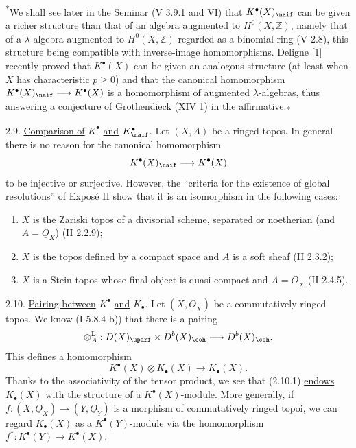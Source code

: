 \textsuperscript{*}We shall see later in the Seminar (V 3.9.1 and VI) that \(K^{\bullet}(X)_{\naif}\) can be given a richer structure than that of an algebra augmented to \(H^0(X,\mathbb Z)\), namely that of a \(\lambda\)-algebra augmented to \(H^0(X,\mathbb Z)\) regarded as a binomial ring (V 2.8), this structure being compatible with inverse-image homomorphisms. Deligne [1] recently proved that \(K^{\bullet}(X)\) can be given an analogous structure (at least when \(X\) has characteristic \(p\geq0\)) and that the canonical homomorphism \(K^{\bullet}(X)_{\naif}\longrightarrow K^{\bullet}(X)\) is a homomorphism of augmented \(\lambda\)-algebras, thus answering a conjecture of Grothendieck (XIV 1) in the affirmative.\textsubscript{*}

2.9. \uline{Comparison of} \(K^{\bullet}\) \uline{and} \(K^{\bullet}_{\naif}\). Let \((X,A)\) be a ringed topos. In general there is no reason for the canonical homomorphism
\[
 K^{\bullet}(X)_{\naif}\longrightarrow K^{\bullet}(X)
\]
to be injective or surjective. However, the ``criteria for the existence of global resolutions'' of Exposé II show that it is an isomorphism in the following cases:
\begin{enumerate}[label=(\roman*)]
\item \(X\) is the Zariski topos of a divisorial scheme, separated or noetherian (and \(A=\underline{O}_X\)) (II 2.2.9);
\item \(X\) is the topos defined by a compact space and \(A\) is a soft sheaf (II 2.3.2);
\item \(X\) is a Stein topos whose final object is quasi-compact and \(A=\underline{O}_X\) (II 2.4.5).
\end{enumerate}

%
2.10. \uline{Pairing between} \(K^{\bullet}\) \uline{and} \(K_{\bullet}\). Let \((X,\underline{O}_X)\) be a commutatively ringed topos. We know (I 5.8.4 b)) that there is a pairing
\[
 \otimes_A^{\mathrm L}:D(X)_{\uparf}\times D^b(X)_{\coh}
 \longrightarrow D^b(X)_{\coh}.
\]
This defines a homomorphism
\begin{equation}\tag{2.10.1}
 K^{\bullet}(X)\otimes K_{\bullet}(X)\longrightarrow K_{\bullet}(X).
\end{equation}
Thanks to the associativity of the tensor product, we see that (2.10.1) \uline{endows} \(K_{\bullet}(X)\) \uline{with the structure of a} \(K^{\bullet}(X)\)-\uline{module}. More generally, if \(f:(X,\underline{O}_X)\longrightarrow(Y,\underline{O}_Y)\) is a morphism of commutatively ringed topoi, we can regard \(K_{\bullet}(X)\) as a \(K^{\bullet}(Y)\)-module via the homomorphism \(f^*:K^{\bullet}(Y)\longrightarrow K^{\bullet}(X)\).

